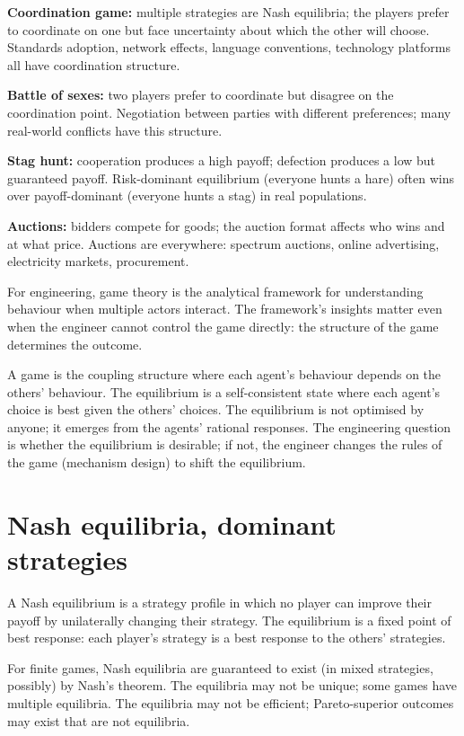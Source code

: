 \textbf{Coordination game:} multiple strategies are Nash equilibria; the players prefer to coordinate on one but face uncertainty about which the other will choose. Standards adoption, network effects, language conventions, technology platforms all have coordination structure.

\textbf{Battle of sexes:} two players prefer to coordinate but disagree on the coordination point. Negotiation between parties with different preferences; many real-world conflicts have this structure.

\textbf{Stag hunt:} cooperation produces a high payoff; defection produces a low but guaranteed payoff. Risk-dominant equilibrium (everyone hunts a hare) often wins over payoff-dominant (everyone hunts a stag) in real populations.

\textbf{Auctions:} bidders compete for goods; the auction format affects who wins and at what price. Auctions are everywhere: spectrum auctions, online advertising, electricity markets, procurement.

For engineering, game theory is the analytical framework for understanding behaviour when multiple actors interact. The framework's insights matter even when the engineer cannot control the game directly: the structure of the game determines the outcome.

\begin{archetype}
A game is the coupling structure where each agent's behaviour depends on the others' behaviour. The equilibrium is a self-consistent state where each agent's choice is best given the others' choices. The equilibrium is not optimised by anyone; it emerges from the agents' rational responses. The engineering question is whether the equilibrium is desirable; if not, the engineer changes the rules of the game (mechanism design) to shift the equilibrium.
\end{archetype}

\section{Nash equilibria, dominant strategies}

A Nash equilibrium is a strategy profile in which no player can improve their payoff by unilaterally changing their strategy. The equilibrium is a fixed point of best response: each player's strategy is a best response to the others' strategies.

For finite games, Nash equilibria are guaranteed to exist (in mixed strategies, possibly) by Nash's theorem. The equilibria may not be unique; some games have multiple equilibria. The equilibria may not be efficient; Pareto-superior outcomes may exist that are not equilibria.

